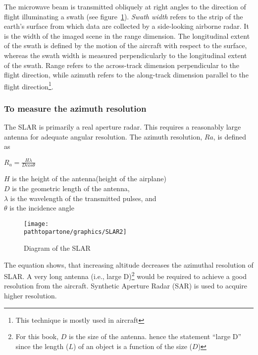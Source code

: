 The microwave beam is transmitted obliquely at right angles to the direction of flight illuminating a swath (see figure~\ref{fig:slar2}). \textit{Swath width} refers to the strip of the earth's surface from which data are collected by a side-looking airborne radar. It is the width of the imaged scene in the range dimension. The longitudinal extent of the swath is defined by the motion of the aircraft with respect to the surface, whereas the swath width is measured perpendicularly to the longitudinal extent of the swath. Range refers to the across-track dimension perpendicular to the flight direction, while azimuth refers to the along-track dimension parallel to the flight direction\footnote{This technique is mostly used in aircraft}.

\subsubsection*{To measure the azimuth resolution}
The SLAR is primarily a real aperture radar. This requires a reasonably large antenna for adequate angular resolution. The azimuth resolution, $ Ra $, is defined as

\begin{center}
$R_{a}=\frac{H \lambda}{D cos\theta}$
\end{center}
$ H $ is the height of the antenna(height of the airplane)\\
$ D $ is the geometric length of the antenna,\\
$\lambda$ is the wavelength of the transmitted pulses, and\\
$\theta$ is the incidence angle

\begin{figure}[h]
\centering
\texttt{[image: \\pathtopartone/graphics/SLAR2]}
\caption{Diagram of the SLAR}
\label{fig:slar2}
\end{figure}

The equation shows, that increasing altitude decreases the azimuthal resolution of SLAR. A very long antenna (i.e., large D)\footnote{For this book, $D$ is the size of the antenna. hence the statement \textquotedblleft large D\textquotedblright\; since the length ($L$) of an object is a function of the size ($D$)} would be required to achieve a good resolution from the aircraft. Synthetic Aperture Radar (SAR) is used to acquire higher resolution.

